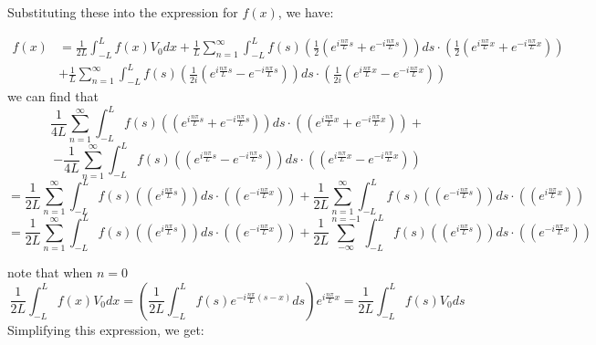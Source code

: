 \documentclass[12pt]{article} %
\begin{document}
Substituting these into the expression for $f(x)$, we have:

\begin{align*}
f(x) &= \frac{1}{2L}\int_{-L}^{L} f(x)V_{0}dx + \frac{1}{L}\sum_{n=1}^{\infty} \int_{-L}^{L} f(s) \left(\frac{1}{2}\left(e^{i\frac{n\pi}{L}s} + e^{-i\frac{n\pi}{L}s}\right)\right) ds \cdot \left(\frac{1}{2}\left(e^{i\frac{n\pi}{L}x} + e^{-i\frac{n\pi}{L}x}\right)\right) \\
&+\frac{1}{L} \sum_{n=1}^{\infty} \int_{-L}^{L} f(s) \left(\frac{1}{2i}\left(e^{i\frac{n\pi}{L}s} - e^{-i\frac{n\pi}{L}s}\right)\right) ds \cdot \left(\frac{1}{2i}\left(e^{i\frac{n\pi}{L}x} - e^{-i\frac{n\pi}{L}x}\right)\right)
\end{align*} we can find that
$$
\frac{1}{4L}\sum_{n=1}^{\infty} \int_{-L}^{L} f(s) \left(\left(e^{i\frac{n\pi}{L}s} + e^{-i\frac{n\pi}{L}s}\right)\right) ds \cdot \left(\left(e^{i\frac{n\pi}{L}x} + e^{-i\frac{n\pi}{L}x}\right)\right)+
$$
$$
-\frac{1}{4L} \sum_{n=1}^{\infty} \int_{-L}^{L} f(s) \left(\left(e^{i\frac{n\pi}{L}s} - e^{-i\frac{n\pi}{L}s}\right)\right) ds \cdot \left(\left(e^{i\frac{n\pi}{L}x} - e^{-i\frac{n\pi}{L}x}\right)\right)
$$
$$
=
\frac{1}{2L}\sum_{n=1}^{\infty} \int_{-L}^{L} f(s) \left(\left(e^{i\frac{n\pi}{L}s}\right)\right) ds \cdot \left(\left( e^{-i\frac{n\pi}{L}x}\right)\right)+\frac{1}{2L}\sum_{n=1}^{\infty} \int_{-L}^{L} f(s) \left(\left(e^{-i\frac{n\pi}{L}s}\right)\right) ds \cdot \left(\left( e^{i\frac{n\pi}{L}x}\right)\right)
$$
$$
=
\frac{1}{2L}\sum_{n=1}^{\infty} \int_{-L}^{L} f(s) \left(\left(e^{i\frac{n\pi}{L}s}\right)\right) ds \cdot \left(\left( e^{-i\frac{n\pi}{L}x}\right)\right)+\frac{1}{2L}\sum_{-\infty}^{n =-1} \int_{-L}^{L} f(s) \left(\left(e^{i\frac{n\pi}{L}s}\right)\right) ds \cdot \left(\left( e^{-i\frac{n\pi}{L}x}\right)\right)
$$


note that when $n = 0$
$$
\frac{1}{2L}\int_{-L}^{L} f(x)V_{0}dx = \left(\frac{1}{2L}\int_{-L}^{L}f(s) e^{-i\frac{n\pi}{L}(s-x)} ds\right) e^{i\frac{n\pi}{L}x}=\frac{1}{2L}\int_{-L}^{L}f(s) V_{0} ds
$$
Simplifying this expression, we get:
\end{document}
